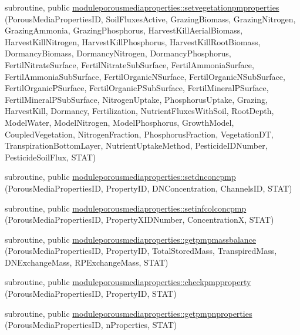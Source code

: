 \begin{DoxyCompactItemize}
subroutine, public \mbox{\hyperlink{namespacemoduleporousmediaproperties_aa2e7bcc28c7132e8ea2228f7f1e227d2}{moduleporousmediaproperties\+::setvegetationpmproperties}} (Porous\+Media\+Properties\+ID, Soil\+Fluxes\+Active, Grazing\+Biomass, Grazing\+Nitrogen, Grazing\+Ammonia, Grazing\+Phosphorus, Harvest\+Kill\+Aerial\+Biomass, Harvest\+Kill\+Nitrogen, Harvest\+Kill\+Phosphorus, Harvest\+Kill\+Root\+Biomass, Dormancy\+Biomass, Dormancy\+Nitrogen, Dormancy\+Phosphorus, Fertil\+Nitrate\+Surface, Fertil\+Nitrate\+Sub\+Surface, Fertil\+Ammonia\+Surface, Fertil\+Ammonia\+Sub\+Surface, Fertil\+Organic\+N\+Surface, Fertil\+Organic\+N\+Sub\+Surface, Fertil\+Organic\+P\+Surface, Fertil\+Organic\+P\+Sub\+Surface, Fertil\+Mineral\+P\+Surface, Fertil\+Mineral\+P\+Sub\+Surface, Nitrogen\+Uptake, Phosphorus\+Uptake, Grazing, Harvest\+Kill, Dormancy, Fertilization, Nutrient\+Fluxes\+With\+Soil, Root\+Depth, Model\+Water, Model\+Nitrogen, Model\+Phosphorus, Growth\+Model, Coupled\+Vegetation, Nitrogen\+Fraction, Phosphorus\+Fraction, Vegetation\+DT, Transpiration\+Bottom\+Layer, Nutrient\+Uptake\+Method, Pesticide\+I\+D\+Number, Pesticide\+Soil\+Flux, S\+T\+AT)
\item 
subroutine, public \mbox{\hyperlink{namespacemoduleporousmediaproperties_a06259226fc0457f3a2a483e2de48d783}{moduleporousmediaproperties\+::setdnconcpmp}} (Porous\+Media\+Properties\+ID, Property\+ID, D\+N\+Concentration, Channels\+ID, S\+T\+AT)
\item 
subroutine, public \mbox{\hyperlink{namespacemoduleporousmediaproperties_ad6dda3a878f9da43d0b12164c09edd9d}{moduleporousmediaproperties\+::setinfcolconcpmp}} (Porous\+Media\+Properties\+ID, Property\+X\+I\+D\+Number, ConcentrationX, S\+T\+AT)
\item 
subroutine, public \mbox{\hyperlink{namespacemoduleporousmediaproperties_aa5824bb6f506f737243ff62a77a6d38c}{moduleporousmediaproperties\+::getpmpmassbalance}} (Porous\+Media\+Properties\+ID, Property\+ID, Total\+Stored\+Mass, Transpired\+Mass, D\+N\+Exchange\+Mass, R\+P\+Exchange\+Mass, S\+T\+AT)
\item 
subroutine, public \mbox{\hyperlink{namespacemoduleporousmediaproperties_aff227e766a06094629675d29f5f9e972}{moduleporousmediaproperties\+::checkpmpproperty}} (Porous\+Media\+Properties\+ID, Property\+ID, S\+T\+AT)
\item 
subroutine, public \mbox{\hyperlink{namespacemoduleporousmediaproperties_a91af77c6bf746b618fd509c6ceb5b42d}{moduleporousmediaproperties\+::getpmpnproperties}} (Porous\+Media\+Properties\+ID, n\+Properties, S\+T\+AT)

\end{DoxyCompactItemize}
